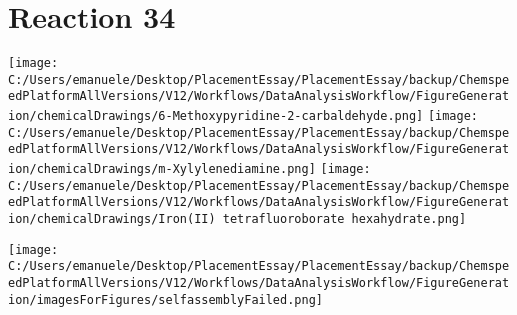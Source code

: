\documentclass{article}%
\begin{document}
\section*{Reaction 34}%
%
\begin{scheme}[H]%
\begin{minipage}{0.5\textwidth}%
\texttt{[image: C:/Users/emanuele/Desktop/PlacementEssay/PlacementEssay/backup/ChemspeedPlatformAllVersions/V12/Workflows/DataAnalysisWorkflow/FigureGeneration/chemicalDrawings/6-Methoxypyridine-2-carbaldehyde.png]}%
\texttt{[image: C:/Users/emanuele/Desktop/PlacementEssay/PlacementEssay/backup/ChemspeedPlatformAllVersions/V12/Workflows/DataAnalysisWorkflow/FigureGeneration/chemicalDrawings/m-Xylylenediamine.png]}%
\texttt{[image: C:/Users/emanuele/Desktop/PlacementEssay/PlacementEssay/backup/ChemspeedPlatformAllVersions/V12/Workflows/DataAnalysisWorkflow/FigureGeneration/chemicalDrawings/Iron(II) tetrafluoroborate hexahydrate.png]}%
\end{minipage}%
\begin{minipage}{0.5\textwidth}%
\begin{center}%
\texttt{[image: C:/Users/emanuele/Desktop/PlacementEssay/PlacementEssay/backup/ChemspeedPlatformAllVersions/V12/Workflows/DataAnalysisWorkflow/FigureGeneration/imagesForFigures/selfassemblyFailed.png]}%
\end{center}%
\end{minipage}%
\caption{Self-assembly of components 6, 18, with Iron(II) in a 3.0:1.5:1.0 molar ratio in CH$_3$CN at 60\textdegree C for 40h. These are the reagents (starting materials) for reaction 34.}%
\end{scheme}%
\end{document}
